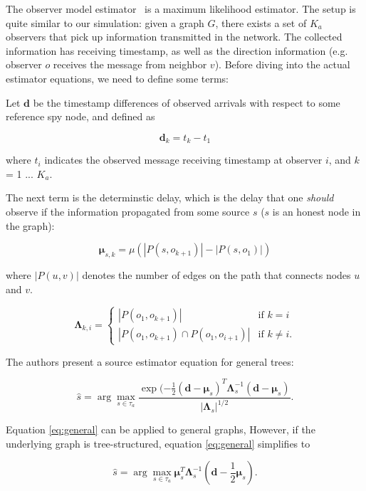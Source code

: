 The observer model estimator~\cite{pinto} is a maximum likelihood estimator. The setup is quite similar to our simulation: given a graph $G$, there exists a set of $K_a$ observers that pick up information transmitted in the network. The collected information has receiving timestamp, as well as the direction information (e.g. observer $o$ receives the message from neighbor $v$). Before diving into the actual estimator equations, we need to define some terms:

Let $\boldsymbol{d}$ be the timestamp differences of observed arrivals with respect to some reference spy node, and defined as

\begin{equation}
  \boldsymbol{d}_k = t_{k} - t_1
\end{equation}

where $t_i$ indicates the observed message receiving timestamp at observer $i$, and $k$ = 1 ... $K_a$.

The next term is the determinstic delay, which is the delay that one \emph{should} observe if the information propagated from some source $s$ ($s$ is an honest node in the graph):

\begin{equation}
  \boldsymbol{\mu}_{s,k} = \mu (|P(s, o_{k+1})| - |P(s, o_1)|)
\end{equation}

where $|P(u, v)|$ denotes the number of edges on the path that connects nodes $u$ and $v$. 

\begin{equation}
  \boldsymbol{\Lambda}_{k, i} = \begin{cases}
    |P(o_1, o_{k+1})| & \text{if $k = i$} \\
    |P(o_1, o_{k+1}) \cap P(o_1, o_{i+1})| & \text{if $k \neq i$}.
  \end{cases}
\end{equation}


The authors present a source estimator equation for general trees:

\begin{equation}
\label{eq:general}
\hat{s} = \arg\max_{s \in \tau_{a}} \dfrac{\exp(-\frac{1}{2} (\boldsymbol{d} - \boldsymbol{\mu}_{s})^{T} \boldsymbol{\Lambda}_s^{-1} (\boldsymbol{d} - \boldsymbol{\mu}_s) }{|\boldsymbol{\Lambda}_s|^{1/2}}.
\end{equation}

Equation \ref{eq:general} can be applied to general graphs, However, if the underlying graph is tree-structured, equation \ref{eq:general} simplifies to

\begin{equation}
\label{eq:tree}
\hat{s} = \arg\max_{s \in \tau_{a}} \boldsymbol{\mu}_{s}^{T} \boldsymbol{\Lambda}_s^{-1} (\boldsymbol{d} - \frac{1}{2}\boldsymbol{\mu}_s).
\end{equation}
